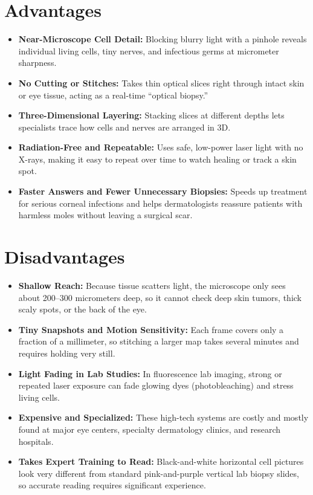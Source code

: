 \section{Advantages}
\begin{itemize}
    \item \textbf{Near-Microscope Cell Detail:} Blocking blurry light with a pinhole reveals individual living cells, tiny nerves, and infectious germs at micrometer sharpness.
    \item \textbf{No Cutting or Stitches:} Takes thin optical slices right through intact skin or eye tissue, acting as a real-time ``optical biopsy.''
    \item \textbf{Three-Dimensional Layering:} Stacking slices at different depths lets specialists trace how cells and nerves are arranged in 3D.
    \item \textbf{Radiation-Free and Repeatable:} Uses safe, low-power laser light with no X-rays, making it easy to repeat over time to watch healing or track a skin spot.
    \item \textbf{Faster Answers and Fewer Unnecessary Biopsies:} Speeds up treatment for serious corneal infections and helps dermatologists reassure patients with harmless moles without leaving a surgical scar.
\end{itemize}

\section{Disadvantages}
\begin{itemize}
    \item \textbf{Shallow Reach:} Because tissue scatters light, the microscope only sees about 200--300 micrometers deep, so it cannot check deep skin tumors, thick scaly spots, or the back of the eye.
    \item \textbf{Tiny Snapshots and Motion Sensitivity:} Each frame covers only a fraction of a millimeter, so stitching a larger map takes several minutes and requires holding very still.
    \item \textbf{Light Fading in Lab Studies:} In fluorescence lab imaging, strong or repeated laser exposure can fade glowing dyes (photobleaching) and stress living cells.
    \item \textbf{Expensive and Specialized:} These high-tech systems are costly and mostly found at major eye centers, specialty dermatology clinics, and research hospitals.
    \item \textbf{Takes Expert Training to Read:} Black-and-white horizontal cell pictures look very different from standard pink-and-purple vertical lab biopsy slides, so accurate reading requires significant experience.
\end{itemize}


